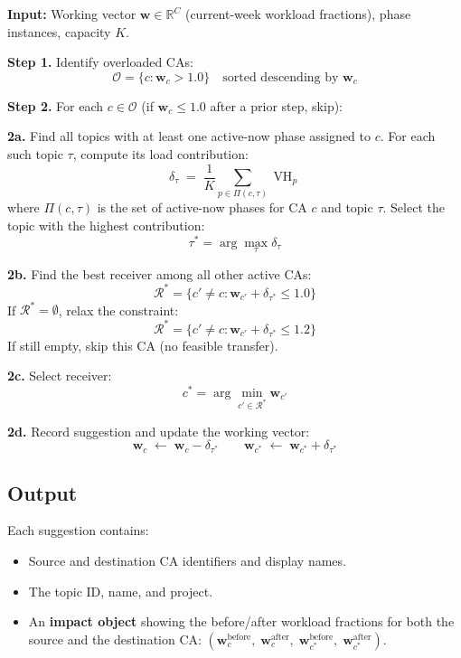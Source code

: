 \documentclass[12pt,a4paper]{report}
\DeclareMathOperator{\vh}{VH}
\begin{document}
\begin{tcolorbox}[defbox, title={Smoothing Algorithm}]
\textbf{Input:} Working vector $\mathbf{w} \in \mathbb{R}^C$
(current-week workload fractions), phase instances, capacity $K$.

\medskip
\textbf{Step 1.} Identify overloaded CAs:
\[
  \mathcal{O} = \{ c : \mathbf{w}_c > 1.0 \}
  \quad \text{sorted descending by } \mathbf{w}_c
\]

\medskip
\textbf{Step 2.} For each $c \in \mathcal{O}$ (if $\mathbf{w}_c \leq 1.0$
after a prior step, skip):

\quad \textbf{2a.} Find all topics with at least one active-now phase
assigned to $c$. For each such topic $\tau$, compute its load
contribution:
\[
  \delta_\tau \;=\;
  \frac{1}{K} \sum_{p \in \Pi(c,\tau)} \vh_p
\]
where $\Pi(c, \tau)$ is the set of active-now phases for CA $c$ and
topic $\tau$. Select the topic with the highest contribution:
\[
  \tau^* = \arg\max_\tau \delta_\tau
\]

\quad \textbf{2b.} Find the best receiver among all other active CAs:
\[
  \mathcal{R}^* = \{c' \neq c : \mathbf{w}_{c'} + \delta_{\tau^*} \leq 1.0\}
\]
If $\mathcal{R}^* = \emptyset$, relax the constraint:
\[
  \mathcal{R}^* = \{c' \neq c : \mathbf{w}_{c'} + \delta_{\tau^*} \leq 1.2\}
\]
If still empty, skip this CA (no feasible transfer).

\quad \textbf{2c.} Select receiver:
\[
  c^* = \arg\min_{c' \in \mathcal{R}^*} \mathbf{w}_{c'}
\]

\quad \textbf{2d.} Record suggestion and update the working vector:
\[
  \mathbf{w}_c \;\leftarrow\; \mathbf{w}_c - \delta_{\tau^*}
  \qquad
  \mathbf{w}_{c^*} \;\leftarrow\; \mathbf{w}_{c^*} + \delta_{\tau^*}
\]
\end{tcolorbox}

\subsection{Output}

Each suggestion contains:
\begin{itemize}
  \item Source and destination CA identifiers and display names.
  \item The topic ID, name, and project.
  \item An \textbf{impact object} showing the before/after workload
        fractions for both the source and the destination CA:
        $(\mathbf{w}_c^{\text{before}},\; \mathbf{w}_c^{\text{after}},\;
           \mathbf{w}_{c^*}^{\text{before}},\; \mathbf{w}_{c^*}^{\text{after}})$.
\end{itemize}
\end{document}
